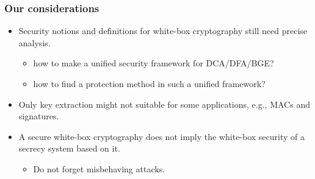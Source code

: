 \documentclass{beamer}
\begin{document}





\frame
{
\frametitle{Our considerations}

\begin{itemize}
\setlength{\itemsep}{12pt}
\item Security notions and definitions for white-box cryptography still need precise analysis.
\begin{itemize}
\item how to make a unified security framework for DCA/DFA/BGE?
\item how to find a protection method in such a unified framework?
\end{itemize}
\item Only key extraction might not suitable for some applications, e.g., MACs and signatures.

\item A secure white-box cryptography does not imply the white-box security of a secrecy system based on it.
\begin{itemize}
\item Do not forget misbehaving attacks.
\end{itemize}
\end{itemize}

}
\end{document}
